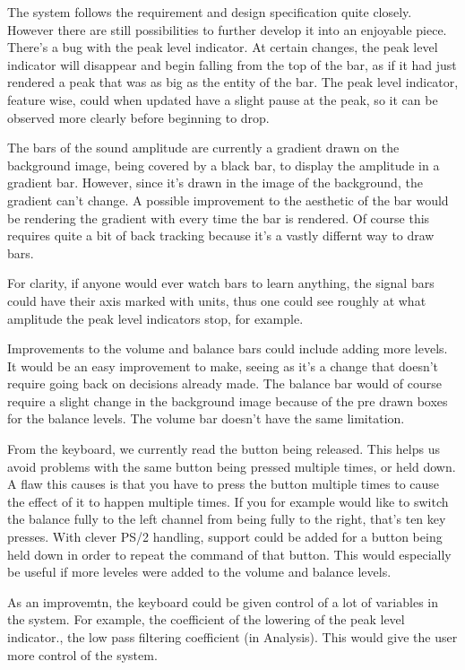 The system follows the requirement and design specification quite closely. However there are still possibilities to further develop it into an enjoyable piece. There's a bug with the peak level indicator.  At certain changes, the peak level indicator will disappear and begin falling from the top of the bar, as if it had just rendered a peak that was as big  as the entity of the bar. The peak level indicator, feature wise, could when updated have a slight pause at the peak, so it can be observed more clearly before beginning to drop.

The bars of the sound amplitude are currently a gradient drawn on the background image, being covered by a black bar, to display the amplitude in a gradient bar. However, since it's drawn in the image of the background, the gradient can't change. A possible improvement to the aesthetic of the bar would be rendering the gradient with every time the bar is rendered. Of course this requires quite a bit of back tracking because it's a vastly differnt way to draw bars. 

For clarity, if anyone would ever watch bars to learn anything, the signal bars could have their axis marked with units, thus one could see roughly at what amplitude the peak level indicators stop, for example.

Improvements to the volume and balance bars could include adding more levels. It would be an easy improvement to make, seeing as it's a change that doesn't require going back on decisions already made. The balance bar would of course require a slight change in the background image because of the pre drawn boxes for the balance levels. The volume bar doesn't have the same limitation.

From the keyboard, we currently read the button being released. This helps us avoid problems with the same button being pressed multiple times, or held down. A flaw this causes is that you have to press the button multiple times to cause the effect of it to happen multiple times. If you for example would like to switch the balance fully to the left channel from being fully to the right, that's ten key presses. With clever PS/2 handling, support could be added for a button being held down in order to  repeat the command of that button. This would especially be useful if more leveles were added to the volume and balance levels. 

As an improvemtn, the keyboard could be given control of a lot of variables in the system. For example, the coefficient of the lowering of the peak level indicator., the low pass filtering coefficient (in Analysis). This would give the user more control of the system.